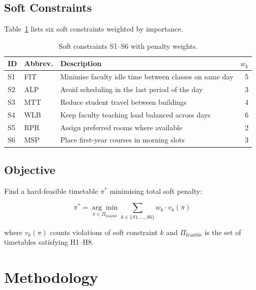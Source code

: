 \documentclass[conference]{IEEEtran}
\begin{document}
\subsection{Soft Constraints}

Table~\ref{tab:soft} lists six soft constraints weighted by importance.

\begin{table}[ht]
\centering
\caption{Soft constraints S1--S6 with penalty weights.}
\label{tab:soft}
\begin{tabularx}{\linewidth}{llXr}
\toprule
\textbf{ID} & \textbf{Abbrev.} & \textbf{Description} & \textbf{$w_k$} \\
\midrule
S1 & FIT & Minimise faculty idle time between classes on same day & 5 \\
S2 & ALP & Avoid scheduling in the last period of the day & 3 \\
S3 & MTT & Reduce student travel between buildings & 4 \\
S4 & WLB & Keep faculty teaching load balanced across days & 6 \\
S5 & RPR & Assign preferred rooms where available & 2 \\
S6 & MSP & Place first-year courses in morning slots & 3 \\
\bottomrule
\end{tabularx}
\end{table}

\subsection{Objective}

Find a hard-feasible timetable $\pi^*$ minimising total soft penalty:

\begin{equation}
\pi^* = \underset{\pi \in \Pi_{\text{feasible}}}{\arg\min}
\sum_{k \in \{S1,\ldots,S6\}} w_k \cdot v_k(\pi)
\label{eq:objective}
\end{equation}

\noindent where $v_k(\pi)$ counts violations of soft constraint $k$ and $\Pi_\text{feasible}$ is the set of timetables satisfying H1--H8.


\section{Methodology}
\label{sec:method}
\end{document}
